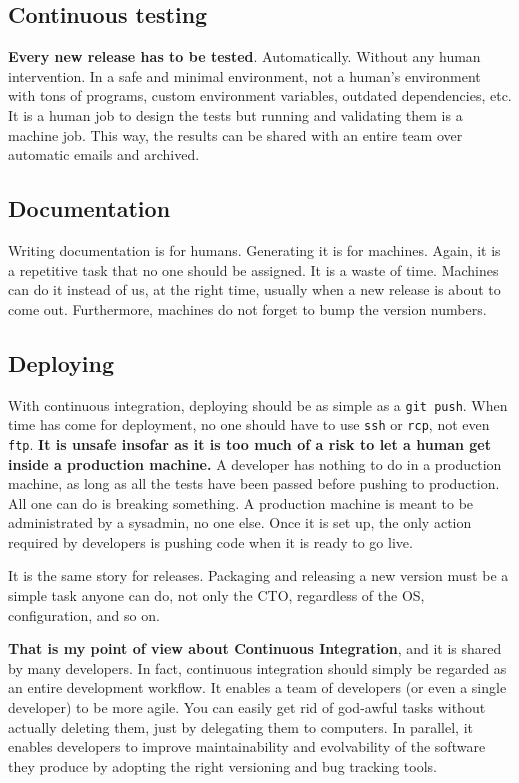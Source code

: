 \subsection{Continuous testing}

\textbf{Every new release has to be tested}. Automatically. Without any human intervention. In a safe and minimal environment, not a human's environment with tons of programs, custom environment variables, outdated dependencies, etc. It is a human job to design the tests but running and validating them is a machine job. This way, the results can be shared with an entire team over automatic emails and archived.

\subsection{Documentation}

Writing documentation is for humans. Generating it is for machines. Again, it is a repetitive task that no one should be assigned. It is a waste of time. Machines can do it instead of us, at the right time, usually when a new release is about to come out. Furthermore, machines do not forget to bump the version numbers.

\subsection{Deploying}

With continuous integration, deploying should be as simple as a \lstinline{git push}. When time has come for deployment, no one should have to use \lstinline{ssh} or \lstinline{rcp}, not even \lstinline{ftp}. \textbf{It is unsafe insofar as it is too much of a risk to let a human get inside a production machine.} A developer has nothing to do in a production machine, as long as all the tests have been passed before pushing to production. All one can do is breaking something. A production machine is meant to be administrated by a sysadmin, no one else. Once it is set up, the only action required by developers is pushing code when it is ready to go live.

\medskip

It is the same story for releases. Packaging and releasing a new version must be a simple task anyone can do, not only the CTO, regardless of the OS, configuration, and so on.

\bigskip
\bigskip

\textbf{That is my point of view about Continuous Integration}, and it is shared by many developers. In fact, continuous integration should simply be regarded as an entire development workflow. It enables a team of developers (or even a single developer) to be more agile. You can easily get rid of god-awful tasks without actually deleting them, just by delegating them to computers. In parallel, it enables developers to improve maintainability and evolvability of the software they produce by adopting the right versioning and bug tracking tools.

